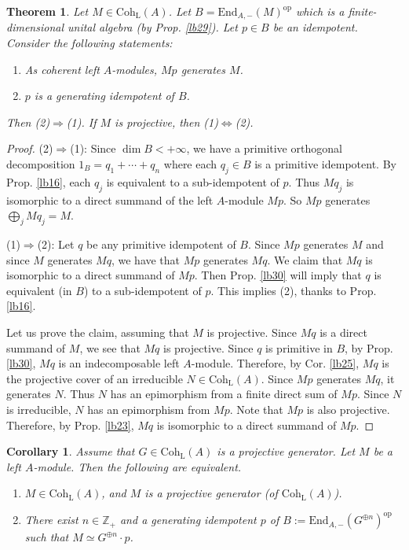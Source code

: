 \documentclass[11pt,b5paper,notitlepage]{article}
\theoremstyle{definition}
\theoremstyle{plain}
\newtheorem{thm}[df]{Theorem}
\newtheorem{co}[df]{Corollary}
\newcommand{\End}{\mathrm{End}} %
\newcommand{\opp}{\mathrm{op}}
\newcommand{\Zbb}{\mathbb Z}
\newcommand{\Coh}{\mathrm{Coh}_{\mathrm L}}
\numberwithin{equation}{section}
\begin{document}
\begin{thm}\label{lb31}
Let $M\in\Coh(A)$. Let $B=\End_{A,-}(M)^\opp$ which is a finite-dimensional unital algebra (by Prop. \ref{lb29}). Let $p\in B$ be an idempotent. Consider the following statements:
\begin{enumerate}[label=(\arabic*)]
\item As coherent left $A$-modules, $Mp$ generates $M$.
\item $p$ is a generating idempotent of $B$.
\end{enumerate}
Then (2)$\Rightarrow$(1). If $M$ is projective, then (1)$\Leftrightarrow$(2). 
\end{thm}



\begin{proof}
(2)$\Rightarrow$(1): Since $\dim B<+\infty$, we have a primitive orthogonal decomposition $1_B=q_1+\cdots+q_n$ where each $q_j\in B$ is a primitive idempotent. By Prop. \ref{lb16}, each $q_j$ is equivalent to a sub-idempotent of $p$. Thus $Mq_j$ is isomorphic to a direct summand of the left $A$-module $Mp$. So $Mp$ generates $\bigoplus_j Mq_j=M$.


(1)$\Rightarrow$(2): Let $q$ be any primitive idempotent of $B$. Since $Mp$ generates $M$ and since $M$ generates $Mq$, we have that $Mp$ generates $Mq$. We claim that $Mq$ is isomorphic to a direct summand of $Mp$. Then Prop. \ref{lb30} will imply that $q$ is equivalent (in $B$) to a sub-idempotent of $p$. This implies (2), thanks to Prop. \ref{lb16}.



Let us prove the claim, assuming that $M$ is projective. Since $Mq$ is a direct summand of $M$, we see that $Mq$ is projective. Since $q$ is primitive in $B$, by Prop. \ref{lb30}, $Mq$ is an indecomposable left $A$-module. Therefore, by Cor. \ref{lb25}, $Mq$ is the projective cover of an irreducible $N\in\Coh(A)$. Since $Mp$ generates $Mq$, it generates $N$. Thus $N$ has an epimorphism from a finite direct sum of $Mp$. Since $N$ is irreducible, $N$ has an epimorphism from $Mp$. Note that $Mp$ is also projective. Therefore, by Prop. \ref{lb23}, $Mq$ is isomorphic to a direct summand of $Mp$.
\end{proof}






\begin{co}\label{lb43}
Assume that $G\in\Coh(A)$ is a projective generator. Let $M$ be a left $A$-module. Then the following are equivalent.
\begin{enumerate}[label=(\arabic*)]
\item $M\in\Coh(A)$, and $M$ is a projective generator (of $\Coh(A)$).
\item There exist $n\in\Zbb_+$ and a generating idempotent $p$ of $B:=\End_{A,-}(G^{\oplus n})^\opp$ such that $M\simeq G^{\oplus n}\cdot p$.
\end{enumerate}
\end{co}
\end{document}
